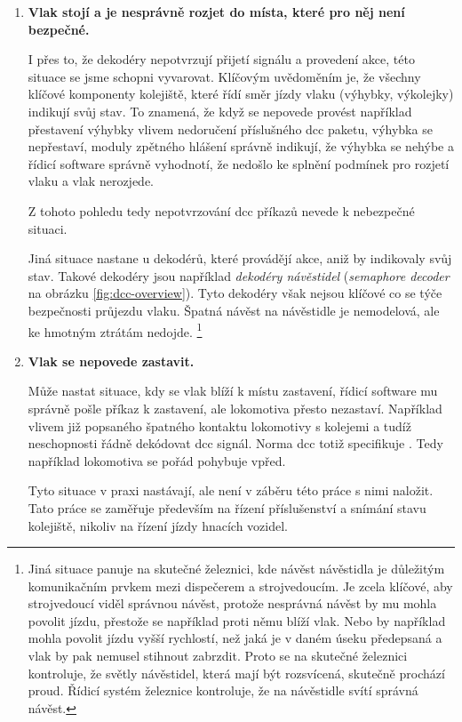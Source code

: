 \begin{enumerate}
\item \textbf{Vlak stojí a je nesprávně rozjet do místa, které pro něj není
bezpečné.}

	I přes to, že dekodéry nepotvrzují přijetí signálu a provedení akce, této
	situace se jsme schopni vyvarovat. Klíčovým uvědoměním je, že všechny klíčové
	komponenty kolejiště, které řídí směr jízdy vlaku (výhybky, výkolejky) indikují
	svůj stav. To znamená, že když se nepovede provést například přestavení výhybky
	vlivem nedoručení příslušného \gls{dcc} paketu, výhybka se nepřestaví, moduly
	zpětného hlášení správně indikují, že výhybka se nehýbe a řídicí software
	správně vyhodnotí, že nedošlo ke splnění podmínek pro rozjetí vlaku a vlak
	nerozjede.

	Z tohoto pohledu tedy nepotvrzování \gls{dcc} příkazů nevede k nebezpečné
	situaci.

	Jiná situace nastane u dekodérů, které provádějí akce, aniž by indikovaly
	svůj stav. Takové dekodéry jsou například \textit{dekodéry návěstidel}
	(\textit{semaphore decoder} na obrázku \ref{fig:dcc-overview}). Tyto dekodéry
	však nejsou klíčové co se týče bezpečnosti průjezdu vlaku. Špatná návěst
	na návěstidle je nemodelová, ale ke hmotným ztrátám nedojde.
	\footnote{Jiná situace panuje na skutečné železnici, kde návěst návěstidla
	je důležitým komunikačním prvkem mezi dispečerem a strojvedoucím. Je zcela
	klíčové, aby strojvedoucí viděl správnou návěst, protože nesprávná návěst
	by mu mohla povolit jízdu, přestože se například proti němu blíží vlak. Nebo
	by například mohla povolit jízdu vyšší rychlostí, než jaká je v daném
	úseku předepsaná a vlak by pak nemusel stihnout zabrzdit. Proto se na skutečné
	železnici kontroluje, že světly návěstidel, která mají být rozsvícená,
	skutečně prochází proud. Řídicí systém železnice kontroluje, že na návěstidle
	svítí správná návěst.}

\item \textbf{Vlak se nepovede zastavit.}

	Může nastat situace, kdy se vlak blíží k místu zastavení, řídicí software
	mu správně pošle příkaz k zastavení, ale lokomotiva přesto nezastaví.
	Například vlivem již popsaného špatného kontaktu lokomotivy s kolejemi
	a tudíž neschopnosti řádně dekódovat \gls{dcc} signál. Norma \gls{dcc} totiž
	specifikuje .
	Tedy například lokomotiva se pořád pohybuje vpřed.

	Tyto situace v praxi nastávají, ale není v záběru této práce s nimi naložit.
	Tato práce se zaměřuje především na řízení příslušenství a snímání stavu
	kolejiště, nikoliv na řízení jízdy hnacích vozidel.

\end{enumerate}


